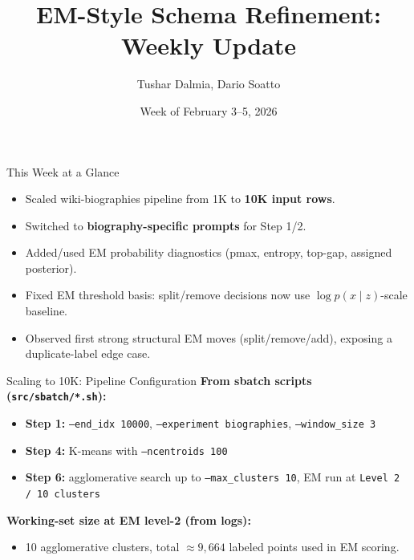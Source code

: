 \documentclass{beamer}
\title{EM-Style Schema Refinement: Weekly Update}
\author{Tushar Dalmia, Dario Soatto}
\date{Week of February 3--5, 2026}
\begin{document}
\begin{frame}
  \titlepage
\end{frame}

\begin{frame}{This Week at a Glance}
\begin{itemize}
  \item Scaled wiki-biographies pipeline from 1K to \textbf{10K input rows}.
  \item Switched to \textbf{biography-specific prompts} for Step 1/2.
  \item Added/used EM probability diagnostics (pmax, entropy, top-gap, assigned posterior).
  \item Fixed EM threshold basis: split/remove decisions now use \(\log p(x \mid z)\)-scale baseline.
  \item Observed first strong structural EM moves (split/remove/add), exposing a duplicate-label edge case.
\end{itemize}
\end{frame}

\begin{frame}{Scaling to 10K: Pipeline Configuration}
\small
\textbf{From sbatch scripts (\texttt{src/sbatch/*.sh}):}
\begin{itemize}
  \item \textbf{Step 1:} \texttt{--end\_idx 10000}, \texttt{--experiment biographies}, \texttt{--window\_size 3}
  \item \textbf{Step 4:} K-means with \texttt{--ncentroids 100}
  \item \textbf{Step 6:} agglomerative search up to \texttt{--max\_clusters 10}, EM run at \texttt{Level 2 / 10 clusters}
\end{itemize}

\textbf{Working-set size at EM level-2 (from logs):}
\begin{itemize}
  \item 10 agglomerative clusters, total \(\approx 9{,}664\) labeled points used in EM scoring.
\end{itemize}
\end{frame}
\end{document}
